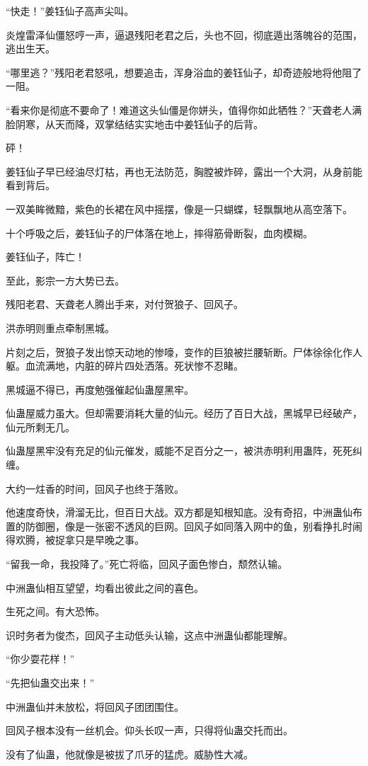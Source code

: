 \begin{this_body}
“快走！”姜钰仙子高声尖叫。

炎煌雷泽仙僵怒哼一声，逼退残阳老君之后，头也不回，彻底遁出落魄谷的范围，逃出生天。

“哪里逃？”残阳老君怒吼，想要追击，浑身浴血的姜钰仙子，却奇迹般地将他阻了一阻。

“看来你是彻底不要命了！难道这头仙僵是你姘头，值得你如此牺牲？”天聋老人满脸阴寒，从天而降，双掌结结实实地击中姜钰仙子的后背。

砰！

姜钰仙子早已经油尽灯枯，再也无法防范，胸膛被炸碎，露出一个大洞，从身前能看到背后。

一双美眸微黯，紫色的长裙在风中摇摆，像是一只蝴蝶，轻飘飘地从高空落下。

十个呼吸之后，姜钰仙子的尸体落在地上，摔得筋骨断裂，血肉模糊。

姜钰仙子，阵亡！

至此，影宗一方大势已去。

残阳老君、天聋老人腾出手来，对付贺狼子、回风子。

洪赤明则重点牵制黑城。

片刻之后，贺狼子发出惊天动地的惨嚎，变作的巨狼被拦腰斩断。尸体徐徐化作人躯。血流满地，内脏的碎片四处洒落。死状惨不忍睹。

黑城逼不得已，再度勉强催起仙蛊屋黑牢。

仙蛊屋威力虽大。但却需要消耗大量的仙元。经历了百日大战，黑城早已经破产，仙元所剩无几。

仙蛊屋黑牢没有充足的仙元催发，威能不足百分之一，被洪赤明利用蛊阵，死死纠缠。

大约一炷香的时间，回风子也终于落败。

他速度奇快，滑溜无比，但百日大战。双方都是知根知底。没有奇招，中洲蛊仙布置的防御圈，像是一张密不透风的巨网。回风子如同落入网中的鱼，别看挣扎时闹得欢腾，被捉拿只是早晚之事。

“留我一命，我投降了。”死亡将临，回风子面色惨白，颓然认输。

中洲蛊仙相互望望，均看出彼此之间的喜色。

生死之间。有大恐怖。

识时务者为俊杰，回风子主动低头认输，这点中洲蛊仙都能理解。

“你少耍花样！”

“先把仙蛊交出来！”

中洲蛊仙并未放松，将回风子团团围住。

回风子根本没有一丝机会。仰头长叹一声，只得将仙蛊交托而出。

没有了仙蛊，他就像是被拔了爪牙的猛虎。威胁性大减。


\end{this_body}
